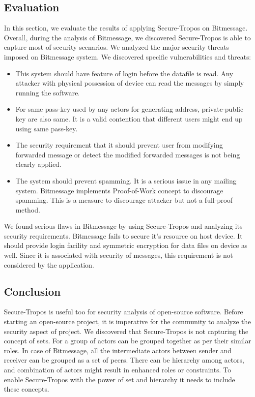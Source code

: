 \documentclass{acm_proc_article-sp}
\begin{document}
\subsection{Evaluation}
In this section, we evaluate the results of applying Secure-Tropos on Bitmessage. Overall, during the analysis of Bitmessage, we discovered Secure-Tropos is able to capture most of security scenarios. We analyzed the major security threats imposed on Bitmessage system. We discovered specific vulnerabilities and threats:
\begin{itemize}
\item This system should have feature of login before the datafile is read. Any attacker with physical possession of device can read the messages by simply running the software.

\item For same pass-key used by any actors for generating address, private-public key are also same. It is a valid contention that different users might end up using same pass-key. 

\item The security requirement that it should prevent user from modifying forwarded message or detect the modified forwarded messages is not being clearly applied.

\item The system should prevent spamming. It is a serious issue in any mailing system. Bitmessage implements Proof-of-Work concept to discourage spamming. This is a measure to discourage attacker but not a full-proof method.
\end{itemize}
 
We found serious flaws in Bitmessage by using Secure-Tropos and analyzing its security requirements. Bitmessage fails to secure it's resource on host device. It should provide login facility and symmetric encryption for data files on device as well. Since it is associated with security of messages, this requirement is not considered by the application.  
 
\subsection{Conclusion}
Secure-Tropos is useful too for security analysis of open-source software. Before starting an open-source project, it is imperative for the community to analyze the security aspect of project. We discovered that Secure-Tropos is not capturing the concept of sets. For a group of actors can be grouped together as per their similar roles. In case of Bitmessage, all the intermediate actors between sender and receiver can be grouped as a set of peers. There can be hierarchy among actors, and combination of actors might result in enhanced roles or constraints. To enable Secure-Tropos with the power of set and hierarchy it needs to include these concepts.  



\end{document}
